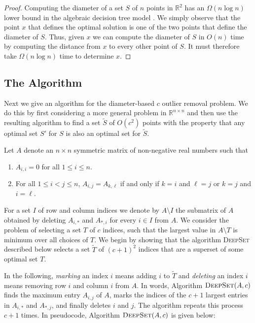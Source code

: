 \documentclass[lotsofwhite]{patmorin}
\begin{document}
\begin{proof}
Computing the diameter of a set $S$ of $n$ points in $\mathbb{R}^2$
has an $\Omega(n\log n)$ lower bound in the algebraic decision tree
model \cite{ps85}.  We simply observe that the point $x$ that defines
the optimal solution is one of the two points that define the diameter
of $S$. Thus, given $x$ we can compute the diameter of $S$ in $O(n)$
time by computing the distance from $x$ to every other point of $S$.
It must therefore take $\Omega(n\log n)$ time to determine $x$. 
\end{proof}


\subsection{The Algorithm}

Next we give an algorithm for the diameter-based $c$ outlier removal
problem.  We do this by first considering a more general problem in
$\mathbb{R}^{n \times n}$ and then use the resulting algorithm to find
a set $\tilde{S}$ of $O(c^2)$ points with the property that any
optimal set $S'$ for $S$ is also an optimal set for $\tilde{S}$. 

Let $A$ denote an $n\times n$ symmetric matrix of non-negative real
numbers such that 
\begin{enumerate}
\item $A_{i,i} = 0$ for all $1\le i\le n$.

\item For all $1\le i<j\le n$, 
     $A_{i,j} = A_{k,\ell}$ if and only if $k=i$ and 
     $\ell=j$ or $k=j$ and $i=\ell$.
\end{enumerate}
For a set $I$
of row and column indices we denote by $A\setminus I$ the submatrix of
$A$ obtained by deleting $A_{i,*}$ and $A_{*,i}$ for every $i\in I$
from $A$.
We consider the problem of selecting a set $T$ of $c$ indices, such
that the largest value in $A\setminus T$ is minimum over all choices
of $T$.  We begin by showing that the algorithm \textsc{DeepSet}
described below selects a set $\tilde{T}$ of $(c+1)^2$ indices that
are a superset of some optimal set $T$.

In the following, \emph{marking} an index $i$ means adding $i$ to
$\tilde{T}$ and \emph{deleting} an index $i$ means removing row $i$
and column $i$ from $A$.  In words, Algorithm $\textsc{DeepSet}(A,c)$
finds the maximum entry $A_{i,j}$ of $A$, marks the indices of the
$c+1$ largest entries in $A_{i,*}$ and $A_{*,j}$, and finally deletes
$i$ and $j$.  The algorithm repeats this process $c+1$ times.  In
pseudocode, Algorithm $\textsc{DeepSet}(A,c)$ is given 
below:
\end{document}
